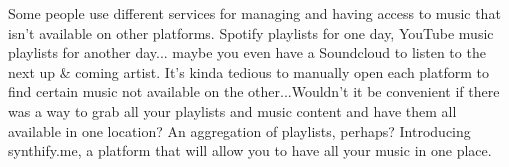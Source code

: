 Some people use different services for managing and having access to music that isn't available on other platforms. Spotify playlists for one day, YouTube music playlists for another day... maybe you even have a Soundcloud to listen to the next up & coming artist. It’s kinda tedious to manually open each platform to find certain music not available on the other...Wouldn't it be convenient if there was a way to grab all your playlists and music content and have them all available in one location? An aggregation of playlists, perhaps? Introducing synthify.me, a platform that will allow you to have all your music in one place.
